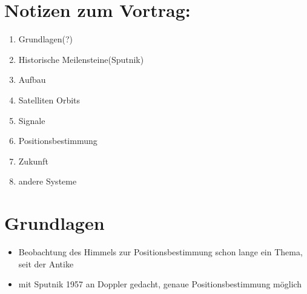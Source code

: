 \documentclass{scrartcl}
\begin{document}
    \section{Notizen zum Vortrag:}
    \begin{enumerate}
        \item Grundlagen(?)
        \item Historische Meilensteine(Sputnik)
        \item Aufbau
        \item Satelliten Orbits
        \item Signale
        \item Positionsbestimmung
        \item Zukunft
        \item andere Systeme
    \end{enumerate}
    \section{Grundlagen}
    \begin{itemize}
        \item Beobachtung des Himmels zur Positionsbestimmung schon lange ein Thema, seit der Antike
        \item mit Sputnik 1957 an Doppler gedacht, genaue Positionsbestimmung möglich
    \end{itemize}
\end{document}
